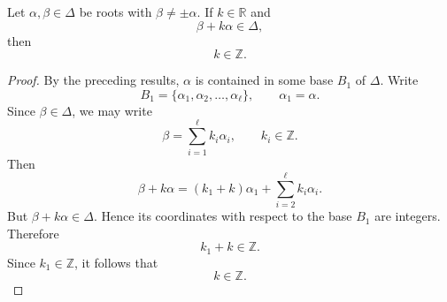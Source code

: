 \begin{corollary}
    Let \(\alpha,\beta\in\Delta\) be roots with \(\beta\neq\pm\alpha\).
    If \(k\in\mathbb{R}\) and
    \[
        \beta+k\alpha\in\Delta,
    \]
    then
    \[
        k\in\mathbb{Z}.
    \]
\end{corollary}

\begin{proof}
    By the preceding results, \(\alpha\) is contained in some base \(B_1\) of
    \(\Delta\). Write
    \[
        B_1=\{\alpha_1,\alpha_2,\dots,\alpha_\ell\},
        \qquad
        \alpha_1=\alpha .
    \]
    Since \(\beta\in\Delta\), we may write
    \[
        \beta
        =
        \sum_{i=1}^{\ell} k_i\alpha_i,
        \qquad
        k_i\in\mathbb{Z}.
    \]
    Then
    \[
        \beta+k\alpha
        =
        (k_1+k)\alpha_1
        +
        \sum_{i=2}^{\ell} k_i\alpha_i .
    \]
    But \(\beta+k\alpha\in\Delta\). Hence its coordinates with respect to the
    base \(B_1\) are integers. Therefore
    \[
        k_1+k\in\mathbb{Z}.
    \]
    Since \(k_1\in\mathbb{Z}\), it follows that
    \[
        k\in\mathbb{Z}.
    \]
\end{proof}

